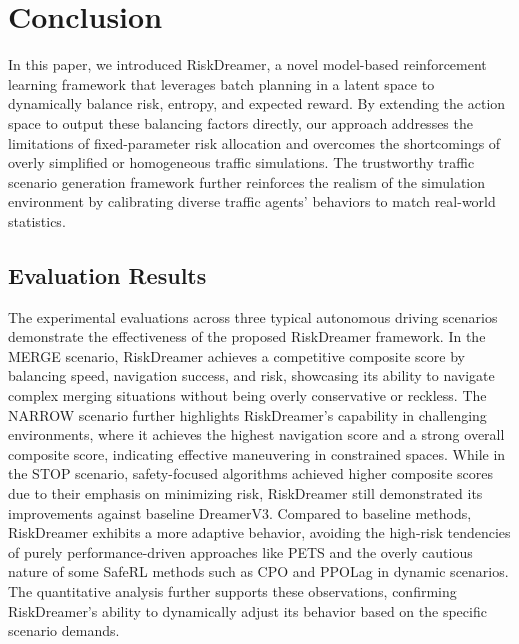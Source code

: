 \section{Conclusion}
\label{sec:conclusion}
In this paper, we introduced RiskDreamer, a novel model-based reinforcement learning framework that leverages batch planning in a latent space to dynamically balance risk, entropy, and expected reward. By extending the action space to output these balancing factors directly, our approach addresses the limitations of fixed-parameter risk allocation and overcomes the shortcomings of overly simplified or homogeneous traffic simulations. The trustworthy traffic scenario generation framework further reinforces the realism of the simulation environment by calibrating diverse traffic agents' behaviors to match real-world statistics.
\subsection{Evaluation Results}
The experimental evaluations across three typical autonomous driving scenarios demonstrate the effectiveness of the proposed RiskDreamer framework. In the MERGE scenario, RiskDreamer achieves a competitive composite score by balancing speed, navigation success, and risk, showcasing its ability to navigate complex merging situations without being overly conservative or reckless. The NARROW scenario further highlights RiskDreamer's capability in challenging environments, where it achieves the highest navigation score and a strong overall composite score, indicating effective maneuvering in constrained spaces. While in the STOP scenario, safety-focused algorithms achieved higher composite scores due to their emphasis on minimizing risk, RiskDreamer still demonstrated its improvements against baseline DreamerV3. Compared to baseline methods, RiskDreamer exhibits a more adaptive behavior, avoiding the high-risk tendencies of purely performance-driven approaches like PETS and the overly cautious nature of some SafeRL methods such as CPO and PPOLag in dynamic scenarios. The quantitative analysis further supports these observations, confirming RiskDreamer's ability to dynamically adjust its behavior based on the specific scenario demands.

